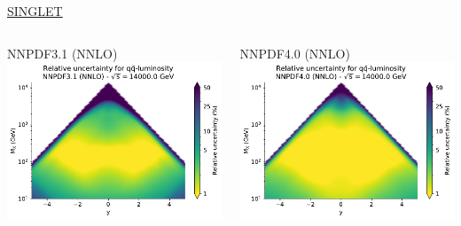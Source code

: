\documentclass{beamer}
\begin{document}
\begin{frame}
\begin{overlayarea}{\textwidth}{5.2cm}
{\begin{columns}[c]
\begin{column}{0.5\textwidth}
   \end{column}
  \end{columns}
  }
  {
  \centering
  \underline{SINGLET}\\
  \begin{columns}[c]
   \begin{column}{0.5\textwidth}
    \centering
        NNPDF3.1 (NNLO)\\
        \vspace{0.1cm}
        \includegraphics[width=\columnwidth]{plots/plot_lumi2d_uncertainty_NNPDF31_qqbar}\\
   \end{column}
   \begin{column}{0.5\textwidth}
    \centering
        NNPDF4.0 (NNLO)\\
        \vspace{0.1cm}
        \includegraphics[width=\columnwidth]{plots/plot_lumi2d_uncertainty_NNPDF40_qqbar}\\    

\end{column}
\end{columns}}
\end{overlayarea}
\end{frame}
\end{document}
